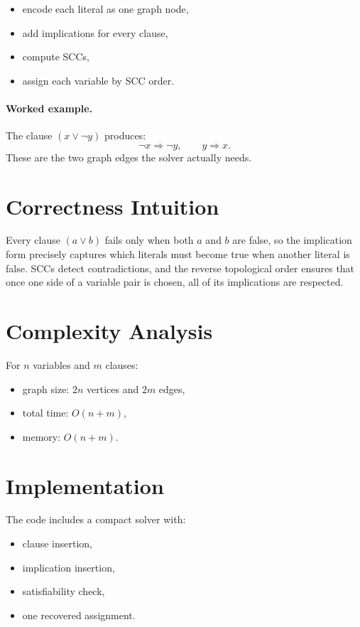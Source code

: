 \begin{itemize}
  \item encode each literal as one graph node,
  \item add implications for every clause,
  \item compute SCCs,
  \item assign each variable by SCC order.
\end{itemize}

\paragraph{Worked example.}
The clause \((x \lor \lnot y)\) produces:
\[
\lnot x \Rightarrow \lnot y,
\qquad
y \Rightarrow x.
\]
These are the two graph edges the solver actually needs.

\section*{Correctness Intuition}

Every clause \((a \lor b)\) fails only when both \(a\) and \(b\) are false, so the implication form precisely captures
which literals must become true when another literal is false. SCCs detect contradictions, and the reverse topological
order ensures that once one side of a variable pair is chosen, all of its implications are respected.

\section*{Complexity Analysis}

For \(n\) variables and \(m\) clauses:
\begin{itemize}
  \item graph size: \(2n\) vertices and \(2m\) edges,
  \item total time: \(O(n + m)\),
  \item memory: \(O(n + m)\).
\end{itemize}

\section*{Implementation}

The code includes a compact solver with:

\begin{itemize}
  \item clause insertion,
  \item implication insertion,
  \item satisfiability check,
  \item one recovered assignment.
\end{itemize}

